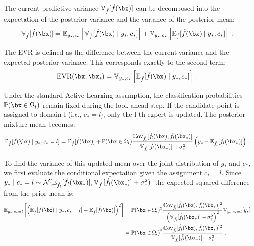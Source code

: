 The current predictive variance $\mathbb{V}_{\hat{f}}[\hat{f}(\bx)]$ can be decomposed into the expectation of the posterior variance and the variance of the posterior mean:
\begin{equation}
    \mathbb{V}_{\hat{f}}[\hat{f}(\bx)] = \mathbb{E}_{y_*, c_*} \left[ \mathbb{V}_{\hat{f}}[\hat{f}(\bx) \mid y_*, c_*] \right] + \mathbb{V}_{y_*, c_*} \left[ \mathbb{E}_{\hat{f}}[\hat{f}(\bx) \mid y_*, c_*] \right] \;.
\end{equation}

The EVR is defined as the difference between the current variance and the expected posterior variance. This corresponds exactly to the second term:
\begin{equation}
    \text{EVR}(\bx; \bx_*) = \mathbb{V}_{y_*, c_*} \left[ \mathbb{E}_{\hat{f}}[\hat{f}(\bx) \mid y_*, c_*] \right] \;.
    \label{eq:evr_definition}
\end{equation}

Under the standard Active Learning assumption, the classification probabilities $\mathbb{P}(\bx \in \Omega_l)$ remain fixed during the look-ahead step. If the candidate point is assigned to domain l (i.e., $c_* = l$), only the l-th expert is updated. The posterior mixture mean becomes:
\begin{equation}
    \mathbb{E}_{\hat{f}}[\hat{f}(\bx) \mid y_*, c_*=l] = \mathbb{E}_{\hat{f}}[\hat{f}(\bx)] + \mathbb{P}(\bx \in \Omega_l) \frac{\mathbb{C}\text{ov}_{\hat{f}_l}[\hat{f}_l(\bx), \hat{f}_l(\bx_*)]}{\mathbb{V}_{\hat{f}_l}[\hat{f}_l(\bx_*)] + \sigma_\varepsilon^2} \left( y_* - \mathbb{E}_{\hat{f}_l}[\hat{f}_l(\bx_*)] \right) \;.
\end{equation}

To find the variance of this updated mean over the joint distribution of $y_*$ and $c_*$, we first evaluate the conditional expectation given the assignment $c_*=l$. Since $y_* \mid c_*=l \sim \mathcal{N}(\mathbb{E}_{\hat{f}_l}[\hat{f}_l(\bx_*)], \mathbb{V}_{\hat{f}_l}[\hat{f}_l(\bx_*)] + \sigma_\varepsilon^2)$, the expected squared difference from the prior mean is:
\begin{align}
    \mathbb{E}_{y_* \mid c_*=l} \left[ \left( \mathbb{E}_{\hat{f}}[\hat{f}(\bx) \mid y_*, c_*=l] - \mathbb{E}_{\hat{f}}[\hat{f}(\bx)] \right)^2 \right] 
    &= \mathbb{P}(\bx \in \Omega_l)^2 \frac{\mathbb{C}\text{ov}_{\hat{f}_l}[\hat{f}_l(\bx), \hat{f}_l(\bx_*)]^2}{\left( \mathbb{V}_{\hat{f}_l}[\hat{f}_l(\bx_*)] + \sigma_\varepsilon^2 \right)^2} \mathbb{V}_{y_* \mid c_*=l}[y_*] \nonumber \\
    &= \mathbb{P}(\bx \in \Omega_l)^2 \frac{\mathbb{C}\text{ov}_{\hat{f}_l}[\hat{f}_l(\bx), \hat{f}_l(\bx_*)]^2}{\mathbb{V}_{\hat{f}_l}[\hat{f}_l(\bx_*)] + \sigma_\varepsilon^2} \;.
\end{align}

